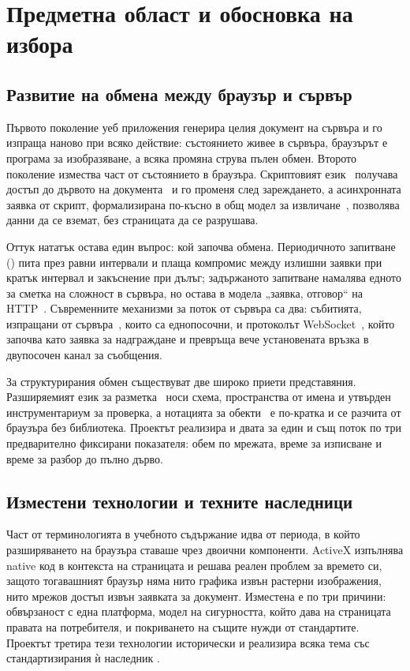 \section{Предметна област и обосновка на избора}
\label{sec:literature}

\subsection{Развитие на обмена между браузър и сървър}

Първото поколение уеб приложения генерира целия документ на сървъра и го изпраща наново при
всяко действие: състоянието живее в сървъра, браузърът е програма за изобразяване, а всяка
промяна струва пълен обмен. Второто поколение измества част от състоянието в браузъра.
Скриптовият език~\cite{ecma262} получава достъп до дървото на документа~\cite{dom_ls} и го
променя след зареждането, а асинхронната заявка от скрипт, формализирана по-късно в общ модел
за извличане~\cite{fetch_ls}, позволява данни да се вземат, без страницата да се разрушава.

Оттук нататък остава един въпрос: кой започва обмена. Периодичното запитване
() пита през равни интервали и плаща компромис между излишни заявки при кратък
интервал и закъснение при дълъг; задържаното запитване намалява едното за сметка на сложност
в сървъра, но остава в модела „заявка, отговор“ на HTTP~\cite{rfc9110}. Съвременните
механизми за поток от сървъра са два: събитията, изпращани от сървъра~\cite{html_ls}, които са
еднопосочни, и протоколът WebSocket~\cite{rfc6455}, който започва като заявка за надграждане и
превръща вече установената връзка в двупосочен канал за съобщения.

За структурирания обмен съществуват две широко приети представяния. Разширяемият език за
разметка~\cite{xml10} носи схема, пространства от имена и утвърден инструментариум за
проверка, а нотацията за обекти~\cite{rfc8259} е по-кратка и се разчита от браузъра без
библиотека. Проектът реализира и двата за един и същ поток по три предварително фиксирани
показателя: обем по мрежата, време за изписване и време за разбор до пълно дърво.

\subsection{Изместени технологии и техните наследници}

Част от терминологията в учебното съдържание идва от периода, в който разширяването на
браузъра ставаше чрез двоични компоненти. ActiveX изпълнява native код в контекста на
страницата и решава реален проблем за времето си, защото тогавашният браузър няма нито
графика извън растерни изображения, нито мрежов достъп извън заявката за документ. Изместена
е по три причини: обвързаност с една платформа, модел на сигурността, който дава на страницата
правата на потребителя, и покриването на същите нужди от стандартите. Проектът третира тези
технологии исторически и реализира всяка тема със стандартизирания ѝ наследник
.

